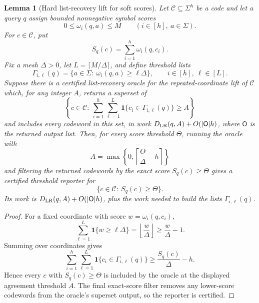 \documentclass[10pt]{article}
\newtheorem{lemma}[theorem]{Lemma}
\theoremstyle{definition}
\begin{document}
\begin{lemma}[Hard list-recovery lift for soft scores]
   \label{lem:hard-list-recovery-lift}
   Let \(\mathcal C\subseteq\Sigma^h\) be a code and let a query \(q\)
   assign bounded nonnegative symbol scores
   \[
      0\le\omega_i(q,a)\le M
      \qquad(i\in[h],\ a\in\Sigma).
   \]
   For \(c\in\mathcal C\), put
   \[
      S_q(c)=\sum_{i=1}^h\omega_i(q,c_i).
   \]
   Fix a mesh \(\Delta>0\), let \(L=\lceil M/\Delta\rceil\), and define
   threshold lists
   \[
      \Gamma_{i,\ell}(q)=
      \{a\in\Sigma:\ \omega_i(q,a)\ge \ell\Delta\},
      \qquad i\in[h],\ \ell\in[L].
   \]
   Suppose there is a certified list-recovery oracle for the repeated-coordinate
   lift of \(\mathcal C\) which, for any integer \(A\), returns a superset of
   \[
      \left\{
      c\in\mathcal C:\
      \sum_{i=1}^h\sum_{\ell=1}^{L}
      \mathbf 1\{c_i\in\Gamma_{i,\ell}(q)\}\ge A
      \right\}
   \]
   and includes every codeword in this set, in work
   \(D_{\rm LR}(q,A)+O(|\mathsf O|h)\), where \(\mathsf O\) is the returned
   output list.  Then, for every score threshold \(\Theta\), running the oracle
   with
   \[
      A=\max\left\{0,\left\lceil \frac{\Theta}{\Delta}-h\right\rceil\right\}
   \]
   and filtering the returned codewords by the exact score \(S_q(c)\ge\Theta\)
   gives a certified threshold reporter for
   \[
      \{c\in\mathcal C:\ S_q(c)\ge\Theta\}.
   \]
   Its work is \(D_{\rm LR}(q,A)+O(|\mathsf O|h)\), plus the work needed to
   build the lists \(\Gamma_{i,\ell}(q)\).
\end{lemma}

\begin{proof}
   For a fixed coordinate with score \(w=\omega_i(q,c_i)\),
   \[
      \sum_{\ell=1}^{L}\mathbf 1\{w\ge \ell\Delta\}
      =
      \left\lfloor \frac{w}{\Delta}\right\rfloor
      \ge
      \frac{w}{\Delta}-1 .
   \]
   Summing over coordinates gives
   \[
      \sum_{i=1}^h\sum_{\ell=1}^{L}
      \mathbf 1\{c_i\in\Gamma_{i,\ell}(q)\}
      \ge
      \frac{S_q(c)}{\Delta}-h .
   \]
   Hence every \(c\) with \(S_q(c)\ge\Theta\) is included by the oracle at the
   displayed agreement threshold \(A\).  The final exact-score filter removes
   any lower-score codewords from the oracle's superset output, so the reporter
   is certified.
\end{proof}
\end{document}
